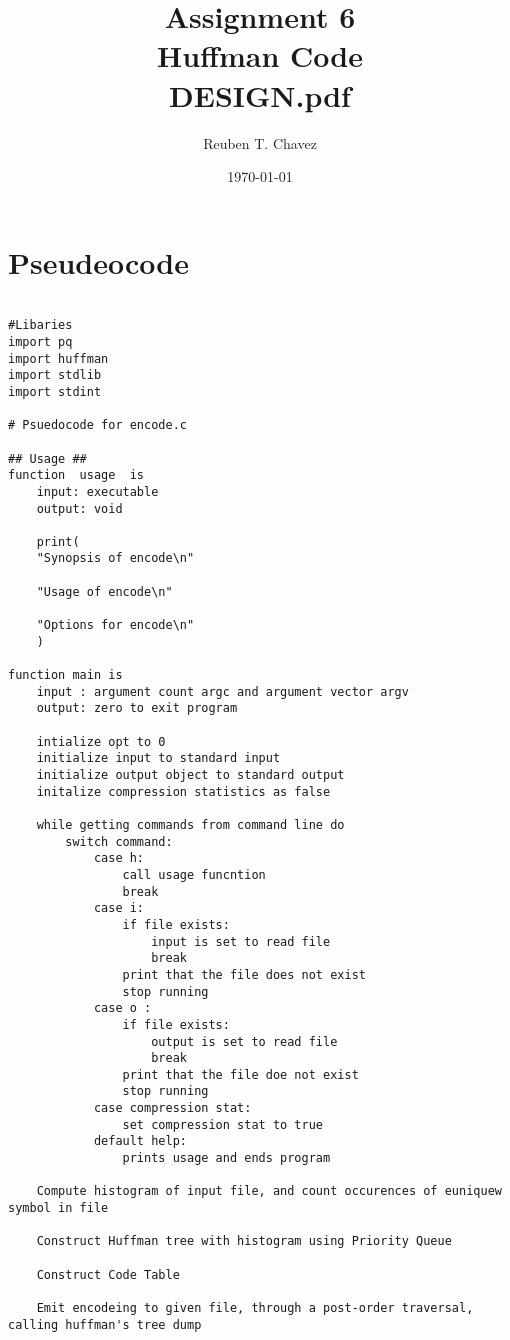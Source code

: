 \documentclass[11pt]{article} %
\title{Assignment 6 \\
    \large Huffman Code \\
    \textbf{DESIGN.pdf}}
\author{Reuben T. Chavez}
\date{\today} %
\begin{document}
\maketitle %

\pagebreak
\section*{Pseudeocode}
\begin{flushleft}

\begin{lstlisting}

#Libaries
import pq
import huffman
import stdlib
import stdint

# Psuedocode for encode.c

## Usage ##
function  usage  is
    input: executable
    output: void

    print(
    "Synopsis of encode\n"

    "Usage of encode\n"

    "Options for encode\n"
    )

function main is
    input : argument count argc and argument vector argv
    output: zero to exit program
    
    intialize opt to 0
    initialize input to standard input
    initialize output object to standard output
    initalize compression statistics as false

    while getting commands from command line do
        switch command:
            case h: 
                call usage funcntion
                break
            case i:
                if file exists:
                    input is set to read file
                    break
                print that the file does not exist
                stop running
            case o :
                if file exists:
                    output is set to read file 
                    break
                print that the file doe not exist
                stop running
            case compression stat:
                set compression stat to true
            default help:
                prints usage and ends program
    
    Compute histogram of input file, and count occurences of euniquew symbol in file

    Construct Huffman tree with histogram using Priority Queue

    Construct Code Table
    
    Emit encodeing to given file, through a post-order traversal, calling huffman's tree dump


\end{lstlisting}
\end{flushleft}
\end{document}
